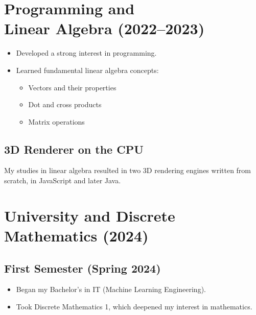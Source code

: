 \documentclass{article}
\begin{document}
\section[Programming and Linear Algebra (2022--2023)]{Programming and \\ Linear Algebra (2022--2023)}
\begin{itemize}
    \item Developed a strong interest in programming.
    \item Learned fundamental linear algebra concepts:
    \begin{itemize}
        \item Vectors and their properties
        \item Dot and cross products
        \item Matrix operations
    \end{itemize}
\end{itemize}
\subsection*{3D Renderer on the CPU}
My studies in linear algebra resulted in two 3D rendering engines written from scratch, in JavaScript and later Java.

\break
\section{University and Discrete Mathematics (2024)}
\subsection{First Semester (Spring 2024)}
\begin{itemize}
    \item Began my Bachelor’s in IT (Machine Learning Engineering).
    \item Took Discrete Mathematics 1, which deepened my interest in mathematics.
\end{itemize}
\end{document}
